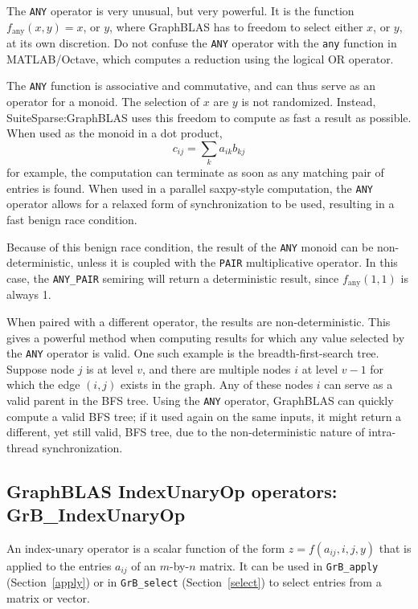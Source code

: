 \documentclass[12pt]{article}
\begin{document}
The \verb'ANY' operator is very unusual, but very powerful.  It is the function
$f_{\mbox{any}}(x,y)=x$, or $y$, where GraphBLAS has to freedom to select
either $x$, or $y$, at its own discretion.  Do not confuse the \verb'ANY'
operator with the \verb'any' function in MATLAB/Octave, which computes a reduction
using the logical OR operator.

The \verb'ANY' function is associative and commutative, and can thus serve as
an operator for a monoid.  The selection of $x$ are $y$ is not randomized.
Instead, SuiteSparse:GraphBLAS uses this freedom to compute as fast a result as
possible.  When used as the monoid in a dot product, \[ c_{ij} = \sum_k a_{ik}
b_{kj} \] for example, the computation can terminate as soon as any matching
pair of entries is found.  When used in a parallel saxpy-style computation, the
\verb'ANY' operator allows for a relaxed form of synchronization to be used,
resulting in a fast benign race condition.

Because of this benign race condition, the result of the \verb'ANY' monoid can
be non-deterministic, unless it is coupled with the \verb'PAIR' multiplicative
operator.  In this case, the \verb'ANY_PAIR' semiring will return a
deterministic result, since $f_{\mbox{any}}(1,1)$ is always 1.

When paired with a different operator, the results are non-deterministic.  This
gives a powerful method when computing results for which any value selected by
the \verb'ANY' operator is valid.  One such example is the breadth-first-search
tree.  Suppose node $j$ is at level $v$, and there are multiple nodes $i$ at
level $v-1$ for which the edge $(i,j)$ exists in the graph.  Any of these nodes
$i$ can serve as a valid parent in the BFS tree.  Using the \verb'ANY'
operator, GraphBLAS can quickly compute a valid BFS tree; if it used again on
the same inputs, it might return a different, yet still valid, BFS tree, due to
the non-deterministic nature of intra-thread synchronization.

\newpage
\subsection{GraphBLAS IndexUnaryOp operators: {\sf GrB\_IndexUnaryOp}} %
\label{idxunop}

An index-unary operator is a scalar function of the form
$z=f(a_{ij},i,j,y)$ that is applied to the entries $a_{ij}$ of an
$m$-by-$n$ matrix.  It can be used in \verb'GrB_apply' (Section~\ref{apply}) or
in \verb'GrB_select' (Section~\ref{select}) to select entries from a matrix or
vector.
\end{document}
